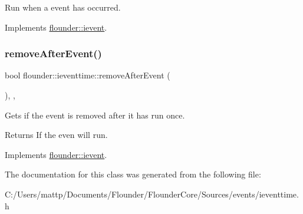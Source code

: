 Run when a event has occurred. 



Implements \hyperlink{classflounder_1_1ievent_a6c6abe67435870b25eccd57a251a8992}{flounder\+::ievent}.

\mbox{\label{classflounder_1_1ieventtime_af64c856310e8249439d0c847943e3490}} 
\subsubsection{\texorpdfstring{remove\+After\+Event()}{removeAfterEvent()}}
{\footnotesize\ttfamily bool flounder\+::ieventtime\+::remove\+After\+Event (\begin{DoxyParamCaption}{ }\end{DoxyParamCaption})\hspace{0.3cm}{\ttfamily [inline]}, {\ttfamily [override]}, {\ttfamily [virtual]}}



Gets if the event is removed after it has run once. 

\begin{DoxyReturn}{Returns}
If the even will run. 
\end{DoxyReturn}


Implements \hyperlink{classflounder_1_1ievent_a7017c8803df2397758980cb61020e801}{flounder\+::ievent}.



The documentation for this class was generated from the following file\+:\begin{DoxyCompactItemize}
\item 
C\+:/\+Users/mattp/\+Documents/\+Flounder/\+Flounder\+Core/\+Sources/events/ieventtime.\+h\end{DoxyCompactItemize}
